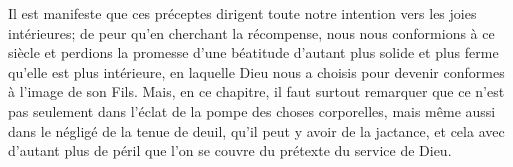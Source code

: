 Il est manifeste que ces préceptes
	dirigent toute notre intention vers les joies intérieures;
	de peur qu'en cherchant la récompense, nous nous conformions à ce siècle
	et perdions la promesse d’une béatitude
		d’autant plus solide et plus ferme qu’elle est plus intérieure,
	en laquelle Dieu nous a choisis
		pour devenir conformes à l’image de son Fils.
Mais, en ce chapitre, il faut surtout remarquer
	que ce n’est pas seulement dans l’éclat de la pompe des choses corporelles,
	mais même aussi dans le négligé de la tenue de deuil,
	qu’il peut y avoir de la jactance,
	et cela avec d’autant plus de péril
		que l’on se couvre du prétexte du service de Dieu.
